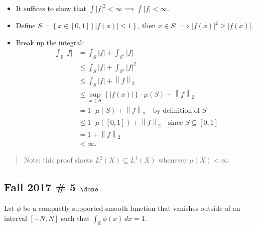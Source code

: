\begin{solution}
\begin{itemize}
\item
  It suffices to show that
  \(\int {\left\lvert {f} \right\rvert}^2 < \infty \implies \int {\left\lvert {f} \right\rvert} < \infty\).
\item
  Define
  \(S = \left\{{x\in [0, 1] {~\mathrel{\Big|}~}{\left\lvert {f(x)} \right\rvert} \leq 1}\right\}\),
  then
  \(x\in S^c \implies {\left\lvert {f(x)} \right\rvert}^2 \geq {\left\lvert {f(x)} \right\rvert}\).
\item
  Break up the integral:
  \begin{align*}
  \int_{\mathbb{R}}{\left\lvert {f} \right\rvert} 
  &= \int_S {\left\lvert {f} \right\rvert} + \int_{S^c} {\left\lvert {f} \right\rvert} \\
  &\leq \int_S {\left\lvert {f} \right\rvert} + \int_{S^c} {\left\lvert {f} \right\rvert}^2 \\
  &\leq \int_S {\left\lvert {f} \right\rvert} + {\left\lVert {f} \right\rVert}_2 \\
  &\leq \sup_{x\in S}\left\{{{\left\lvert {f(x)} \right\rvert}}\right\} \cdot \mu(S) + {\left\lVert {f} \right\rVert}_2 \\
  &= 1 \cdot \mu(S) + {\left\lVert {f} \right\rVert}_2 \quad\text{by definition of } S\\
  &\leq 1 \cdot \mu([0, 1]) + {\left\lVert {f} \right\rVert}_2 \quad\text{since } S\subseteq [0, 1] \\
  &= 1 + {\left\lVert {f} \right\rVert}_2 \\
  &< \infty
  .\end{align*}
\end{itemize}

\begin{quote}
Note: this proof shows \(L^2(X) \subseteq L^1(X)\) whenever
\(\mu(X) < \infty\).
\end{quote}

\end{solution}

\hypertarget{fall-2017-5-done}{%
\subsection{\texorpdfstring{Fall 2017 \# 5
\(\done\)}{Fall 2017 \# 5 \textbackslash done}}\label{fall-2017-5-done}}

Let \(\phi\) be a compactly supported smooth function that vanishes
outside of an interval \([-N, N]\) such that
\(\int _{{\mathbb{R}}} \phi(x) \, dx = 1\).

